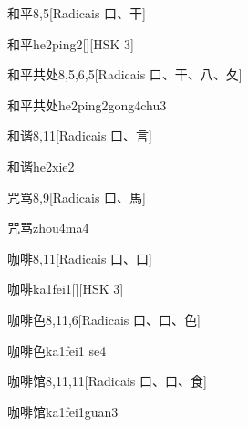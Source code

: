 \begin{entry}{和平}{8,5}[Radicais ⼝、⼲]
  \begin{phonetics}{和平}{he2ping2}[][HSK 3]
  \end{phonetics}
\end{entry}

\begin{entry}{和平共处}{8,5,6,5}[Radicais ⼝、⼲、⼋、⼡]
  \begin{phonetics}{和平共处}{he2ping2gong4chu3}
  \end{phonetics}
\end{entry}

\begin{entry}{和谐}{8,11}[Radicais ⼝、⾔]
  \begin{phonetics}{和谐}{he2xie2}
  \end{phonetics}
\end{entry}

\begin{entry}{咒骂}{8,9}[Radicais ⼝、⾺]
  \begin{phonetics}{咒骂}{zhou4ma4}
  \end{phonetics}
\end{entry}

\begin{entry}{咖啡}{8,11}[Radicais ⼝、⼝]
  \begin{phonetics}{咖啡}{ka1fei1}[][HSK 3]
  \end{phonetics}
\end{entry}

\begin{entry}{咖啡色}{8,11,6}[Radicais ⼝、⼝、⾊]
  \begin{phonetics}{咖啡色}{ka1fei1 se4}
  \end{phonetics}
\end{entry}

\begin{entry}{咖啡馆}{8,11,11}[Radicais ⼝、⼝、⾷]
  \begin{phonetics}{咖啡馆}{ka1fei1guan3}
  \end{phonetics}
\end{entry}

